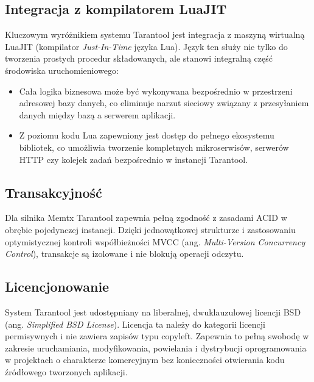 \subsection{Integracja z kompilatorem LuaJIT}
Kluczowym wyróżnikiem systemu Tarantool jest integracja z maszyną wirtualną LuaJIT (kompilator \emph{Just-In-Time} języka Lua). Język ten służy nie tylko do tworzenia prostych procedur składowanych, ale stanowi integralną część środowiska uruchomieniowego:
\begin{itemize}
    \item Cała logika biznesowa może być wykonywana bezpośrednio w przestrzeni adresowej bazy danych, co eliminuje narzut sieciowy związany z przesyłaniem danych między bazą a serwerem aplikacji.
    \item Z poziomu kodu Lua zapewniony jest dostęp do pełnego ekosystemu bibliotek, co umożliwia tworzenie kompletnych mikroserwisów, serwerów HTTP czy kolejek zadań bezpośrednio w instancji Tarantool.
\end{itemize}

\subsection{Transakcyjność}
Dla silnika Memtx Tarantool zapewnia pełną zgodność z zasadami ACID w obrębie pojedynczej instancji. Dzięki jednowątkowej strukturze i zastosowaniu optymistycznej kontroli współbieżności MVCC (ang. \emph{Multi-Version Concurrency Control}), transakcje są izolowane i nie blokują operacji odczytu.

\subsection{Licencjonowanie}
System Tarantool jest udostępniany na liberalnej, dwuklauzulowej licencji BSD (ang. \emph{Simplified BSD License}). Licencja ta należy do kategorii licencji permisywnych i nie zawiera zapisów typu copyleft. Zapewnia to pełną swobodę w zakresie uruchamiania, modyfikowania, powielania i dystrybucji oprogramowania w projektach o charakterze komercyjnym bez konieczności otwierania kodu źródłowego tworzonych aplikacji.

